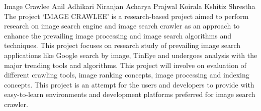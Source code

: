  \begin{conf-abstract}[]
 {Image Crawlee}
{
Anil Adhikari
Niranjan Acharya
Prajwal Koirala
Kshitiz Shrestha
}
{}
The project `IMAGE CRAWLEE' is a research-based project aimed to perform research on image search 
engine and image search crawler as an approach to enhance the prevailing image processing and image 
search algorithms and techniques. This project focuses on research study of prevailing image search 
applications like Google search by image, TinEye and undergoes analysis with the major trending tools 
and algorithms. This project will involve on evaluation of different crawling tools, image ranking concepts,
image processing and indexing concepts. This project is an attempt for the users and developers to 
provide with easy-to-learn environments and development platforms preferred for image search crawler.
  \end{conf-abstract}